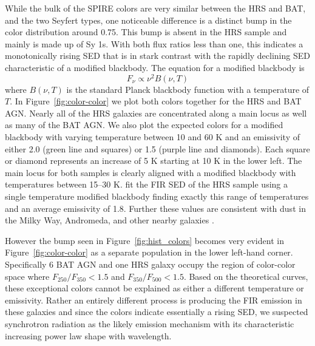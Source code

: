 While the bulk of the SPIRE colors are very similar between the HRS and BAT, and the two Seyfert types, one noticeable difference is a distinct bump in the color distribution around 0.75. This bump is absent in the HRS sample and mainly is made up of Sy 1s. With both flux ratios less than one, this indicates a monotonically rising SED that is in stark contrast with the rapidly declining SED characteristic of a modified blackbody. The equation for a modified blackbody is
\begin{equation}\label{eq:mod_blackbody}
F_{\nu} \propto \nu^{2}B(\nu, T)
\end{equation}
\noindent where $B(\nu, T)$ is the standard Planck blackbody function with a temperature of $T$. In Figure~\ref{fig:color-color} we plot both colors together for the HRS and BAT AGN. Nearly all of the HRS galaxies are concentrated along a main locus as well as many of the BAT AGN. We also plot the expected colors for a modified blackbody with varying temperature between 10 and 60 K and an emissivity of either 2.0 (green line and squares) or 1.5 (purple line and diamonds). Each square or diamond represents an increase of 5 K starting at 10 K in the lower left. The main locus for both samples is clearly aligned with a modified blackbody with temperatures between 15--30 K. \cite{Cortese:2014qq} fit the FIR SED of the HRS sample using a single temperature modified blackbody finding exactly this range of temperatures and an average emissivity of 1.8. Further these values are consistent with dust in the Milky Way, Andromeda, and other nearby galaxies \citep{Galametz:2012uq, Boselli:2012qv, Smith:2012fj}. 

However the bump seen in Figure~\ref{fig:hist_colors} becomes very evident in Figure~\ref{fig:color-color} as a separate population in the lower left-hand corner. Specifically 6 BAT AGN and one HRS galaxy occupy the region of color-color space where $F_{250}/F_{350} < 1.5$ and $F_{350}/F_{500} < 1.5$. Based on the theoretical curves, these exceptional colors cannot be explained as either a different temperature or emissivity. Rather an entirely different process is producing the FIR emission in these galaxies and since the colors indicate essentially a rising SED, we suspected synchrotron radiation as the likely emission mechanism with its characteristic increasing power law shape with wavelength.
  
  